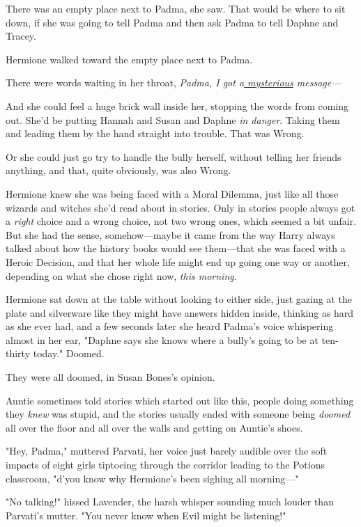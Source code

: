 There was an empty place next to Padma, she saw. That would be where to sit
down, if she was going to tell Padma and then ask Padma to tell Daphne and
Tracey.

Hermione walked toward the empty place next to Padma.

There were words waiting in her throat, \emph{Padma, I got a\underline{
mysterious} message—}

And she could feel a huge brick wall inside her, stopping the words from coming
out. She'd be putting Hannah and Susan and Daphne \emph{in danger}. Taking them
and leading them by the hand straight into trouble. That was Wrong.

Or she could just go try to handle the bully herself, without telling her
friends anything, and that, quite obviously, was also Wrong.

Hermione knew she was being faced with a Moral Dilemma, just like all those
wizards and witches she'd read about in stories. Only in stories people always
got a \emph{right} choice and a wrong choice, not two wrong ones, which seemed
a bit unfair. But she had the sense, somehow—maybe it came from the way Harry
always talked about how the history books would see them—that she was faced
with a Heroic Decision, and that her whole life might end up going one way or
another, depending on what she chose right now, \emph{this morning}.

Hermione sat down at the table without looking to either side, just gazing at
the plate and silverware like they might have answers hidden inside, thinking
as hard as she ever had, and a few seconds later she heard Padma's voice
whispering almost in her ear, "Daphne says she knows where a bully's going to
be at ten-thirty today."
\sbreak
Doomed.

They were all doomed, in Susan Bones's opinion.

Auntie sometimes told stories which started out like this, people doing
something they \emph{knew} was stupid, and the stories usually ended with
someone being \emph{doomed} all over the floor and all over the walls and
getting on Auntie's shoes.

"Hey, Padma," muttered Parvati, her voice just barely audible over the soft
impacts of eight girls tiptoeing through the corridor leading to the Potions
classroom, "d'you know why Hermione's been sighing all morning—"

"No talking!" hissed Lavender, the harsh whisper sounding much louder than
Parvati's mutter. "You never know when Evil might be listening!"

